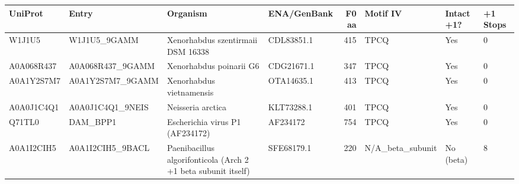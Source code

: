 \documentclass[10pt,letterpaper]{article}
\begin{document}
\vspace{8pt}
\vspace{3pt}
{\scriptsize\setlength{\tabcolsep}{3.2pt}\renewcommand{\arraystretch}{1.10}
\begin{longtable}{@{}llllrlll@{}}
\toprule
\textbf{UniProt} & \textbf{Entry} & \textbf{Organism} & \textbf{ENA/GenBank} & \textbf{F0 aa} & \textbf{Motif IV} & \textbf{Intact +1?} & \textbf{+1 Stops} \\
\midrule
\endhead
\bottomrule
\endfoot
W1J1U5 & W1J1U5\_9GAMM & Xenorhabdus szentirmaii DSM 16338 & CDL83851.1 & 415 & TPCQ & Yes & 0 \\
A0A068R437 & A0A068R437\_9GAMM & Xenorhabdus poinarii G6 & CDG21671.1 & 347 & TPCQ & Yes & 0 \\
A0A1Y2S7M7 & A0A1Y2S7M7\_9GAMM & Xenorhabdus vietnamensis & OTA14635.1 & 413 & TPCQ & Yes & 0 \\
A0A0J1C4Q1 & A0A0J1C4Q1\_9NEIS & Neisseria arctica & KLT73288.1 & 401 & TPCQ & Yes & 0 \\
Q71TL0 & DAM\_BPP1 & Escherichia virus P1 (AF234172) & AF234172 & 754 & TPCQ & Yes & 0 \\
A0A1I2CIH5 & A0A1I2CIH5\_9BACL & Paenibacillus algorifonticola (Arch 2 +1 beta subunit itself) & SFE68179.1 & 220 & N/A\_beta\_subunit & No (beta) & 8 \\
\end{longtable}
}

\newpage
\end{document}
